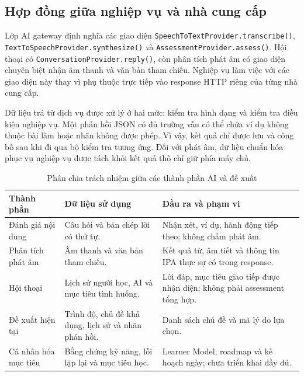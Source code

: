 \documentclass[12pt,a4paper,oneside]{report}
\begin{document}
\subsection{Hợp đồng giữa nghiệp vụ và nhà cung cấp}

Lớp AI gateway định nghĩa các giao diện \texttt{SpeechToTextProvider.transcribe()}, \texttt{TextToSpeechProvider.synthesize()} và \texttt{AssessmentProvider.assess()}. Hội thoại có \texttt{ConversationProvider.reply()}, còn phân tích phát âm có giao diện chuyên biệt nhận âm thanh và văn bản tham chiếu. Nghiệp vụ làm việc với các giao diện này thay vì phụ thuộc trực tiếp vào response HTTP riêng của từng nhà cung cấp.

Dữ liệu trả từ dịch vụ được xử lý ở hai mức: kiểm tra hình dạng và kiểm tra điều kiện nghiệp vụ. Một phản hồi JSON có đủ trường vẫn có thể chứa ví dụ không thuộc bài làm hoặc nhãn không được phép. Vì vậy, kết quả chỉ được lưu và công bố sau khi đi qua bộ kiểm tra tương ứng. Đối với phát âm, dữ liệu chuẩn hóa phục vụ nghiệp vụ được tách khỏi kết quả thô chỉ giữ phía máy chủ.

\begin{table}[htbp]
    \centering
    \small
    \begin{tabularx}{\linewidth}{@{}p{3cm}XX@{}}
        \toprule
        \textbf{Thành phần} & \textbf{Dữ liệu sử dụng} & \textbf{Đầu ra và phạm vi} \\
        \midrule
        Đánh giá nội dung & Câu hỏi và bản chép lời có thứ tự. & Nhận xét, ví dụ, hành động tiếp theo; không chấm phát âm. \\
        \addlinespace
        Phân tích phát âm & Âm thanh và văn bản tham chiếu. & Kết quả từ, âm tiết và thông tin IPA thực sự có trong response. \\
        \addlinespace
        Hội thoại & Lịch sử người học, AI và mục tiêu tình huống. & Lời đáp, mục tiêu giao tiếp được nhận diện; không phải assessment tổng hợp. \\
        \addlinespace
        Đề xuất hiện tại & Trình độ, chủ đề khả dụng, lịch sử và nhãn phản hồi. & Danh sách chủ đề và mã lý do lựa chọn. \\
        \addlinespace
        Cá nhân hóa mục tiêu & Bằng chứng kỹ năng, lỗi lặp lại và mục tiêu học. & Learner Model, roadmap và kế hoạch ngày; chưa triển khai đầy đủ. \\
        \bottomrule
    \end{tabularx}
    \caption{Phân chia trách nhiệm giữa các thành phần AI và đề xuất}
    \label{tab:ai-responsibilities}
\end{table}
\end{document}
